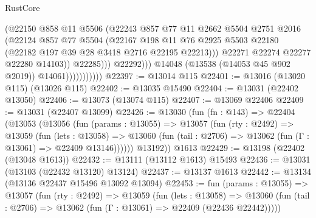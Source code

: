 \begin{lexlean}{RustCore}
\begin{coremodule}
                                      (@22150
                                        @858
                                        @11
                                        @5506
                                        (@22243
                                          @857
                                          @77
                                          @11
                                          @2662
                                          @5504
                                          @2751
                                          @2016
                                          (@22124
                                            @857
                                            @77
                                            @5504
                                            (@22167
                                              @198
                                              @11
                                              @76
                                              @2925
                                              @5503
                                              @22180
                                              (@22182 @197 @39 @28 @3418 @2716 @22195 @22213)))
                                          @22271
                                          @22274
                                          @22277
                                          @22280
                                          @14103))
                                      @22285)))
                                @22292)))
                          @14048
                          (@13538 (@14053 @45 @902 @2019))
                          @14061)))))))))))
@22397 := @13014 @115
@22401 := @13016 (@13020 @115) (@13026 @115)
@22402 := @13035 @15490
@22404 := @13031 (@22402 @13050)
@22406 := @13073 (@13074 @115)
@22407 := @13069 @22406
@22409 := @13031 (@22407 @13099)
@22426 := @13030
    (fun (fn : @143) =>
    @22404
      (@13053
        (@13056
          (fun (params : @13055) =>
          @13057
            (fun (rty : @2492) =>
            @13059
              (fun (lets : @13058) =>
              @13060 (fun (tail : @2706) => @13062 (fun (Γ : @13061) => @22409 @13146))))))
        @13192))
    @1613
@22429 := @13198 (@22402 (@13048 @1613))
@22432 := @13111 (@13112 @1613) @15493
@22436 := @13031 (@13103 (@22432 @13120) @13124)
@22437 := @13137 @1613
@22442 := @13134 (@13136 @22437 @15496 @13092 @13094)
@22453 := fun (params : @13055) =>
  @13057
    (fun (rty : @2492) =>
    @13059
      (fun (lets : @13058) =>
      @13060 (fun (tail : @2706) => @13062 (fun (Γ : @13061) => @22409 (@22436 @22442)))))

\end{coremodule}
\end{lexlean}
